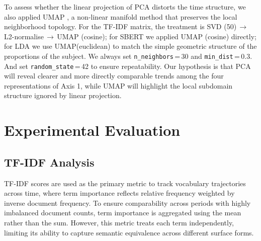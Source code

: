 
To assess whether the linear projection of PCA distorts the time structure, we also applied UMAP \citep{mcinnes2018umap-software}, a non-linear manifold method that preserves the local neighborhood topology. For the TF-IDF matrix, the treatment is SVD (50)\,$\to$\,L2-normalise\,$\to$\,UMAP (cosine); for SBERT we applied UMAP (cosine) directly; for LDA we use UMAP(euclidean) to match the simple geometric structure of the proportions of the subject. We always set \texttt{n\_neighbors}\,=\,30 and \texttt{min\_dist}\,=\,0.3. And set \texttt{random\_state}\,=\,42 to ensure repeatability. Our hypothesis is that PCA will reveal clearer and more directly comparable trends among the four representations of Axis 1, while UMAP will highlight the local subdomain structure ignored by linear projection.

\section{Experimental Evaluation}
\label{sec:eval}


\subsection{TF-IDF Analysis}

TF-IDF scores are used as the primary metric to track vocabulary trajectories across time, where term importance reflects relative frequency weighted by inverse document frequency. To ensure comparability across periods with highly imbalanced document counts, term importance is aggregated using the mean rather than the sum. However, this metric treats each term independently, limiting its ability to capture semantic equivalence across different surface forms.

